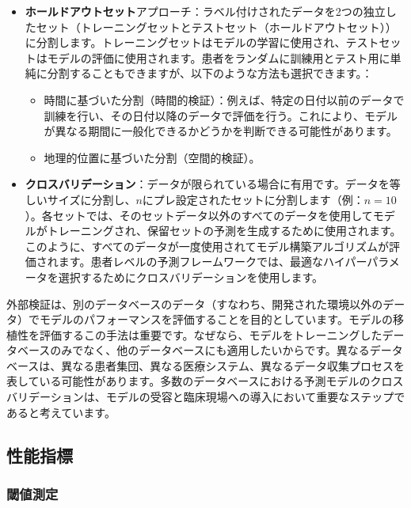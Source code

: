 \documentclass[
  11pt]{book}
\providecommand{\tightlist}{%
  \setlength{\itemsep}{0pt}\setlength{\parskip}{0pt}}
\theoremstyle{definition}
\theoremstyle{definition}
\theoremstyle{definition}
\theoremstyle{definition}
\theoremstyle{remark}
\begin{document}
\begin{itemize}
\tightlist
\item
  \textbf{ホールドアウトセット}アプローチ：ラベル付けされたデータを2つの独立したセット（トレーニングセットとテストセット（ホールドアウトセット））に分割します。トレーニングセットはモデルの学習に使用され、テストセットはモデルの評価に使用されます。患者をランダムに訓練用とテスト用に単純に分割することもできますが、以下のような方法も選択できます。：

  \begin{itemize}
  \tightlist
  \item
    時間に基づいた分割（時間的検証）：例えば、特定の日付以前のデータで訓練を行い、その日付以降のデータで評価を行う。これにより、モデルが異なる期間に一般化できるかどうかを判断できる可能性があります。
  \item
    地理的位置に基づいた分割（空間的検証）。 
  \end{itemize}
\item
  \textbf{クロスバリデーション}：データが限られている場合に有用です。データを等しいサイズに分割し、\(n\)にプレ設定されたセットに分割します（例：\(n=10\)）。各セットでは、そのセットデータ以外のすべてのデータを使用してモデルがトレーニングされ、保留セットの予測を生成するために使用されます。このように、すべてのデータが一度使用されてモデル構築アルゴリズムが評価されます。患者レベルの予測フレームワークでは、最適なハイパーパラメータを選択するためにクロスバリデーションを使用します。
\end{itemize}

外部検証は、別のデータベースのデータ（すなわち、開発された環境以外のデータ）でモデルのパフォーマンスを評価することを目的としています。モデルの移植性を評価するこの手法は重要です。なぜなら、モデルをトレーニングしたデータベースのみでなく、他のデータベースにも適用したいからです。異なるデータベースは、異なる患者集団、異なる医療システム、異なるデータ収集プロセスを表している可能性があります。多数のデータベースにおける予測モデルのクロスバリデーションは、モデルの受容と臨床現場への導入において重要なステップであると考えています。

\subsection{性能指標}\label{performance}

\subsubsection*{閾値測定}\label{ux95beux5024ux6e2cux5b9a}
\end{document}
